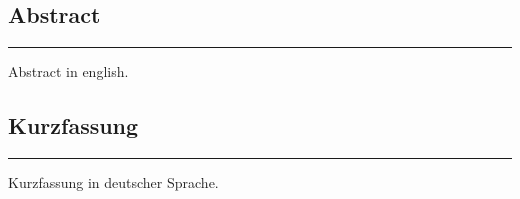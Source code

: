 

\subsection*{Abstract}
\vspace*{-.5cm}
\rule{\textwidth}{.5pt}
\vspace*{-.5cm}

Abstract in english.

\subsection*{Kurzfassung}
\vspace*{-.5cm}
\rule{\textwidth}{.5pt}
\vspace*{-.5cm}

Kurzfassung in deutscher Sprache.
